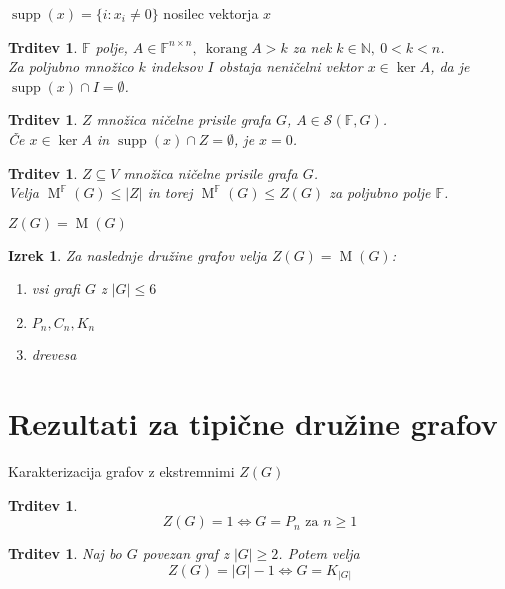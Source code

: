\documentclass{beamer}
\newtheorem{trditev}[theorem]{Trditev}
\newtheorem{izrek}[theorem]{Izrek}
\newcommand{\N}{\ensuremath{\mathbb{N}}}
\newcommand{\F}{\ensuremath{\mathbb{F}}}
\DeclareMathOperator{\korang}{korang}
\DeclareMathOperator{\M}{M}
\DeclareMathOperator{\supp}{supp}
\begin{document}
\begin{frame}
    $\supp(x) = \{i \colon x_i \neq 0 \} $ \alert{nosilec} vektorja $x$
    
    \medskip
    
    \begin{trditev}
        $\F$ polje, $A \in \F^{n \times n},\ \korang A > k$ za nek $k \in \N, \ 0 < k < n$.\\
        Za poljubno množico $k$ indeksov $I$ obstaja neničelni vektor $x \in \ker A$, da je $\supp(x) \cap I = \emptyset$.
    \end{trditev}
    
    \begin{trditev}
        $Z$ množica ničelne prisile grafa $G$, $A \in \mathcal{S}(\F,G)$. \\
        Če $x \in \ker A$ in $\supp(x) \cap Z = \emptyset$, je $x = 0$.
    \end{trditev}
    
    \begin{trditev}
        $Z \subseteq V$ množica ničelne prisile grafa $G$. \\ 
        Velja $\M^\F(G) \leq |Z|$ in torej $\M^\F(G) \leq Z(G)$ za poljubno polje $\F$.
    \end{trditev}
\end{frame}

\begin{frame}{$Z(G) = \M(G)$}
    \begin{izrek}
        Za naslednje družine grafov velja $Z(G) = \M(G)$:
        \begin{enumerate}
            \item vsi grafi $G$ z $|G| \leq 6$
            \item $P_n, C_n, K_n$
            \item drevesa
        \end{enumerate}
    \end{izrek}
\end{frame}

\section{Rezultati za tipične družine grafov}
\begin{frame}{Karakterizacija grafov z ekstremnimi $Z(G)$}
    \begin{trditev}
        \[ Z(G) = 1 \iff G = P_n \text{ za } n \geq 1 \]
    \end{trditev}
    
    \bigskip
    
    \begin{trditev}
        Naj bo $G$ povezan graf z $|G| \geq 2$. Potem velja
        \[ Z(G) = |G|-1 \iff G = K_{|G|} \]
    \end{trditev}
\end{frame}
\end{document}
